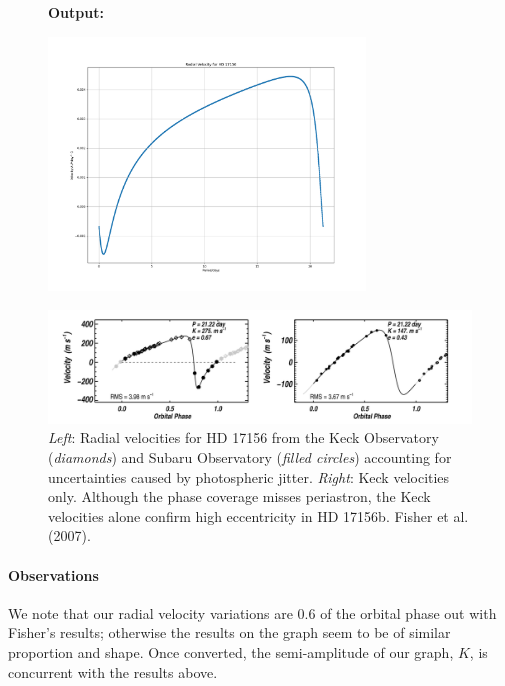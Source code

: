 \documentclass[11pt]{article}
\newcommand*{\figuretitle}[1]{
    	{\textbf{#1}
    	\par\vspace{-1em}}
    }
\begin{document}
\begin{figure}
	\figuretitle{Output:}
	\centering
	\includegraphics[width=0.75\textwidth]{../matplotlib_graphs/radial_velocity_1.png}
\end{figure} 
    

\begin{figure}
	\centering 
	\includegraphics[width=\textwidth]{../images/radial_v_graph.png}
	\caption{{\it Left}: Radial velocities for HD 17156 from the Keck Observatory ({\it diamonds}) and Subaru Observatory ({\it filled circles}) accounting for uncertainties caused by photospheric jitter. {\it Right}: Keck velocities only. Although the phase coverage misses periastron, the Keck velocities alone confirm high eccentricity in HD 17156b. Fisher et al. (2007).} 
	\label{Figure 4.b}
\end{figure}



    \hypertarget{observations}{%
\paragraph{Observations}\label{observations_2}}

We note that our radial velocity variations are 0.6 of the orbital phase out with Fisher's results; otherwise the results on the graph seem to be of similar proportion and shape. Once converted, the semi-amplitude of our graph, \(K\), is concurrent with the results above.
\end{document}
